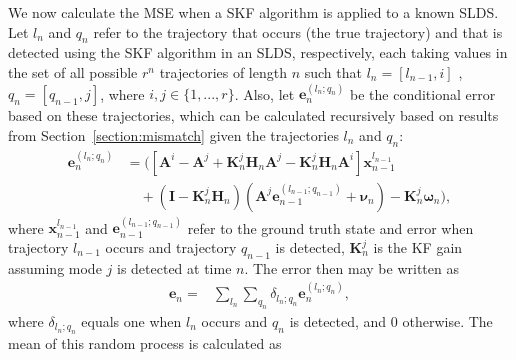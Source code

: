 \documentclass[journal]{IEEEtran}
\begin{document}
We now calculate the MSE when a SKF algorithm is applied to a known SLDS. Let $l_n$ and $q_n$ refer to the trajectory that occurs (the true trajectory) and that is detected using the SKF algorithm in an SLDS, respectively, each taking values in the set of all possible $r^n$ trajectories of length $n$ such that $l_n=[l_{n-1},i]$ , $q_n=[q_{n-1},j]$, where $i,j\in \{1,...,r\}$. Also, let $\bm{e}_n^{(l_n;q_n)}$ be the conditional error based on these trajectories, which can be calculated recursively based on results from Section~\ref{section:mismatch} given the trajectories $l_n$ and $q_n$: 
\begin{align}
    \bm{e}_n^{(l_n;q_n)}&=([\bm{A}^{i}-\bm{A}^j+\bm{K}_n^j\bm{H}_n\bm{A}^j-\bm{K}_n^j\bm{H}_n\bm{A}^{i}]\bm{x}_{n-1}^{l_{n-1}}\nonumber\\
    &\quad+(\bm{I}-\bm{K}_n^j\bm{H}_n)(\bm{A}^j\bm{e}_{n-1}^{(l_{n-1};q_{n-1})}+\bm{\nu}_n) -\bm{K}_n^j\bm{\omega}_n),
    \label{eq:switch_e_rec}
\end{align}
where $\bm{x}_{n-1}^{l_{n-1}}$ and $\bm{e}_{n-1}^{(l_{n-1};q_{n-1})}$ refer to the ground truth state and error when trajectory $l_{n-1}$ occurs and trajectory $q_{n-1}$ is detected, $\bm{K}_n^j$ is the KF gain assuming mode $j$ is detected at time $n$. The error then may be written as
\begin{align}
    \bm{e}_n =& \sum_{l_n}\sum_{q_n}\delta_{l_n;q_n}\bm{e}_n^{(l_n;q_n)} , \label{eqn:switche}
\end{align}
where $\delta_{l_n;q_n}$ equals one when $l_n$ occurs and $q_n$ is detected, and 0 otherwise. The mean of this random process is calculated as
\end{document}
